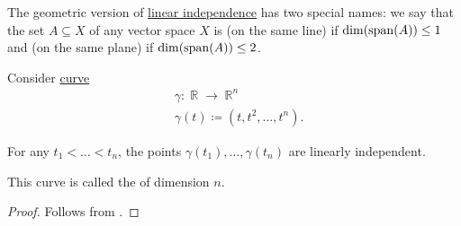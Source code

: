 \begin{definition}\label{def:collinear_complanar}
  The geometric version of \hyperref[def:semimodule_basis/independent]{linear independence} has two special names: we say that the set \( A \subseteq X \) of any vector space \( X \) is  (on the same line) if \( \dim(\operatorname{span}(A)) \leq 1 \) and  (on the same plane) if \( \dim(\operatorname{span}(A)) \leq 2 \).
\end{definition}

\begin{proposition}\label{thm:moment_curve}
  Consider \hyperref[def:parametric_curve]{curve}
  \begin{equation*}
    \begin{aligned}
      &\gamma: \BbbR \to \BbbR^n \\
      &\gamma(t) \coloneqq (t, t^2, \ldots, t^n).
    \end{aligned}
  \end{equation*}

  For any \( t_1 < \ldots < t_n \), the points \( \gamma(t_1), \ldots, \gamma(t_n) \) are linearly independent.

  This curve is called the  of dimension \( n \).
\end{proposition}
\begin{proof}
  Follows from .
\end{proof}

